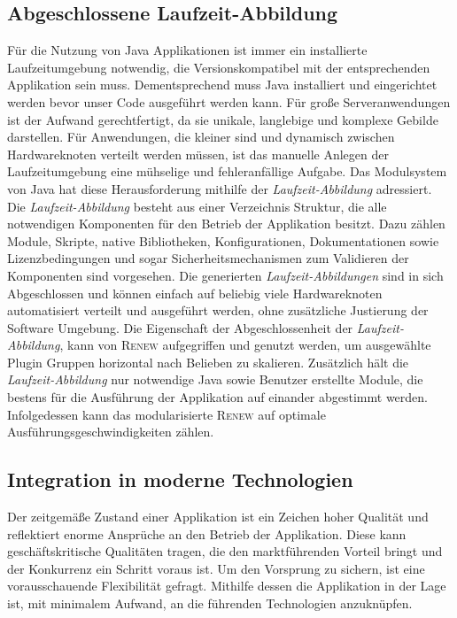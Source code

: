 	\subsection{Abgeschlossene Laufzeit-Abbildung} \label{sub:laufzeit_images}
		Für die Nutzung von Java Applikationen ist immer ein installierte Laufzeitumgebung notwendig, die Versionskompatibel mit der entsprechenden Applikation sein muss. Dementsprechend muss Java installiert und eingerichtet werden bevor unser Code ausgeführt werden kann. Für große Serveranwendungen ist der Aufwand gerechtfertigt, da sie unikale, langlebige und komplexe Gebilde darstellen. Für Anwendungen, die kleiner sind und dynamisch zwischen Hardwareknoten verteilt werden müssen, ist das manuelle Anlegen der Laufzeitumgebung eine mühselige und fehleranfällige Aufgabe. \newline
		Das Modulsystem von Java hat diese Herausforderung mithilfe der \textit{Laufzeit-Abbildung} adressiert. Die \textit{Laufzeit-Abbildung} besteht aus einer Verzeichnis Struktur, die alle notwendigen Komponenten für den Betrieb der Applikation besitzt. Dazu zählen Module, Skripte, native Bibliotheken, Konfigurationen, Dokumentationen sowie Lizenzbedingungen und sogar Sicherheitsmechanismen zum Validieren der Komponenten sind vorgesehen. Die generierten \textit{Laufzeit-Abbildungen} sind in sich Abgeschlossen und können einfach auf beliebig viele Hardwareknoten automatisiert verteilt und ausgeführt werden, ohne zusätzliche Justierung der Software Umgebung. \bigbreak
		Die Eigenschaft der Abgeschlossenheit der \textit{Laufzeit-Abbildung}, kann von \textsc{Renew} aufgegriffen und genutzt werden, um ausgewählte Plugin Gruppen horizontal nach Belieben zu skalieren. Zusätzlich hält die \textit{Laufzeit-Abbildung} nur notwendige Java sowie Benutzer erstellte Module, die bestens für die Ausführung der Applikation auf einander abgestimmt werden. Infolgedessen kann das modularisierte \textsc{Renew} auf optimale Ausführungsgeschwindigkeiten zählen. 

	\subsection{Integration in moderne Technologien} \label{sub:moderner_zustand}
		Der zeitgemäße Zustand einer Applikation ist ein Zeichen hoher Qualität und reflektiert enorme Ansprüche an den Betrieb der Applikation. Diese kann geschäftskritische Qualitäten tragen, die den marktführenden Vorteil bringt und der Konkurrenz ein Schritt voraus ist. Um den Vorsprung zu sichern, ist eine vorausschauende Flexibilität gefragt. Mithilfe dessen die Applikation in der Lage ist, mit minimalem Aufwand, an die führenden Technologien anzuknüpfen.

